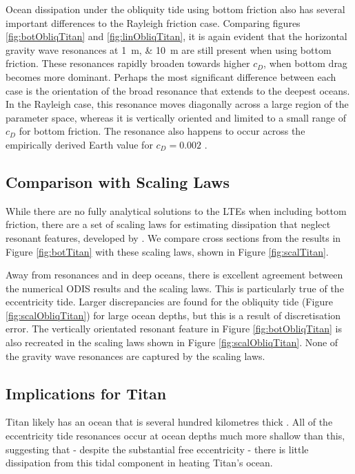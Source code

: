 Ocean dissipation under the obliquity tide using bottom friction also has several important differences to the Rayleigh friction case. Comparing figures \ref{fig:botObliqTitan} and \ref{fig:linObliqTitan}, it is again evident that the horizontal gravity wave resonances at \SIlist{1;10}{\metre} are still present when using bottom friction. These resonances rapidly broaden towards higher $c_D$, when bottom drag becomes more dominant. Perhaps the most significant difference between each case is the orientation of the broad resonance that extends to the deepest oceans. In the Rayleigh case, this resonance moves diagonally across a large region of the parameter space, whereas it is vertically oriented and limited to a small range of $c_D$ for bottom friction. The resonance also happens to occur across the empirically derived Earth value for $c_D = 0.002$ \citep[e.g.,][]{sohl1995tidal,egbert2001estimates}.

\subsection{Comparison with Scaling Laws \label{subsec:scalTitan}}

While there are no fully analytical solutions to the LTEs when including bottom friction, there are a set of scaling laws for estimating dissipation that neglect resonant features, developed by \citet{chen2013tidal}. We compare cross sections from the results in Figure \ref{fig:botTitan} with these scaling laws, shown in Figure \ref{fig:scalTitan}.



Away from resonances and in deep oceans, there is excellent agreement between the numerical ODIS results and the scaling laws. This is particularly true of the eccentricity tide. Larger discrepancies are found for the obliquity tide (Figure \ref{fig:scalObliqTitan}) for large ocean depths, but this is a result of discretisation error. The vertically orientated resonant feature in Figure \ref{fig:botObliqTitan} is also recreated in the scaling laws shown in Figure \ref{fig:scalObliqTitan}. None of the gravity wave resonances are captured by the scaling laws. 

\subsection{Implications for Titan}

Titan likely has an ocean that is several hundred kilometres thick \citep{sohl2003interior}. All of the eccentricity tide resonances occur at ocean depths much more shallow than this, suggesting that - despite the substantial free eccentricity - there is little dissipation from this tidal component in heating Titan's ocean.

